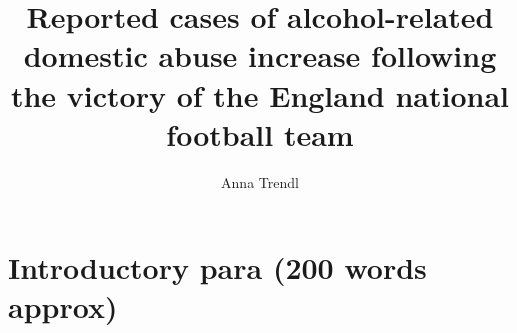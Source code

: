 \documentclass[12pt, letterpaper]{article}
\newcommand{\NS}[1] {{\textcolor{green}{#1}}}
\begin{document}
\title{Reported cases of alcohol-related domestic abuse increase following the victory of the England national football team}
\author{Anna Trendl}
\maketitle


%
%

\section{Introductory para (200 words approx)}
\end{document}
